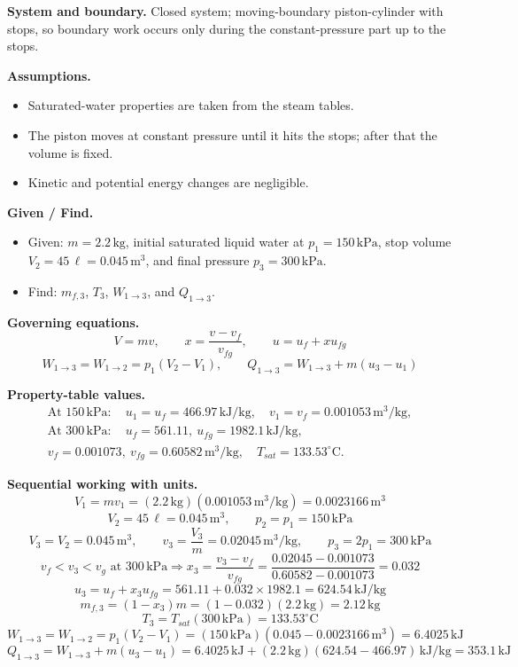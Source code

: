 \textbf{System and boundary.} Closed system; moving-boundary piston-cylinder with stops, so boundary work occurs only during the constant-pressure part up to the stops.

\textbf{Assumptions.}
\begin{itemize}
  \item Saturated-water properties are taken from the steam tables.
  \item The piston moves at constant pressure until it hits the stops; after that the volume is fixed.
  \item Kinetic and potential energy changes are negligible.
\end{itemize}

\textbf{Given / Find.}
\begin{itemize}
  \item Given: $m=2.2\,\mathrm{kg}$, initial saturated liquid water at $p_1=150\,\mathrm{kPa}$, stop volume $V_2=45\,\ell=0.045\,\mathrm{m}^3$, and final pressure $p_3=300\,\mathrm{kPa}$.
  \item Find: $m_{f,3}$, $T_3$, $W_{1\to3}$, and $Q_{1\to3}$.
\end{itemize}

\textbf{Governing equations.}
\[
V=mv,\qquad x=\frac{v-v_f}{v_{fg}},\qquad u=u_f+xu_{fg}
\]
\[
W_{1\to3}=W_{1\to2}=p_1(V_2-V_1),\qquad Q_{1\to3}=W_{1\to3}+m(u_3-u_1)
\]

\textbf{Property-table values.}
\[
\begin{gathered}
\text{At }150\,\mathrm{kPa}:\quad u_1=u_f=466.97\,\mathrm{kJ/kg},\quad v_1=v_f=0.001053\,\mathrm{m^3/kg},\\
\text{At }300\,\mathrm{kPa}:\quad u_f=561.11,\ u_{fg}=1982.1\,\mathrm{kJ/kg},\\
v_f=0.001073,\ v_{fg}=0.60582\,\mathrm{m^3/kg},\quad T_{sat}=133.53^\circ\mathrm{C}.
\end{gathered}
\]

\textbf{Sequential working with units.}
\[
V_1=mv_1=(2.2\,\mathrm{kg})(0.001053\,\mathrm{m^3/kg})=0.0023166\,\mathrm{m^3}
\]
\[
V_2=45\,\ell=0.045\,\mathrm{m^3},\qquad p_2=p_1=150\,\mathrm{kPa}
\]
\[
V_3=V_2=0.045\,\mathrm{m^3},\qquad v_3=\frac{V_3}{m}=0.02045\,\mathrm{m^3/kg},\qquad p_3=2p_1=300\,\mathrm{kPa}
\]
\[
v_f<v_3<v_g\text{ at }300\,\mathrm{kPa}\Rightarrow x_3=\frac{v_3-v_f}{v_{fg}}=\frac{0.02045-0.001073}{0.60582-0.001073}=0.032
\]
\[
u_3=u_f+x_3u_{fg}=561.11+0.032\times 1982.1=624.54\,\mathrm{kJ/kg}
\]
\[
m_{f,3}=(1-x_3)m=(1-0.032)(2.2\,\mathrm{kg})=2.12\,\mathrm{kg}
\]
\[
T_3=T_{sat}(300\,\mathrm{kPa})=133.53^\circ\mathrm{C}
\]
\[
W_{1\to3}=W_{1\to2}=p_1(V_2-V_1)=(150\,\mathrm{kPa})(0.045-0.0023166\,\mathrm{m^3})=6.4025\,\mathrm{kJ}
\]
\[
Q_{1\to3}=W_{1\to3}+m(u_3-u_1)=6.4025\,\mathrm{kJ}+(2.2\,\mathrm{kg})(624.54-466.97)\,\mathrm{kJ/kg}=353.1\,\mathrm{kJ}
\]

